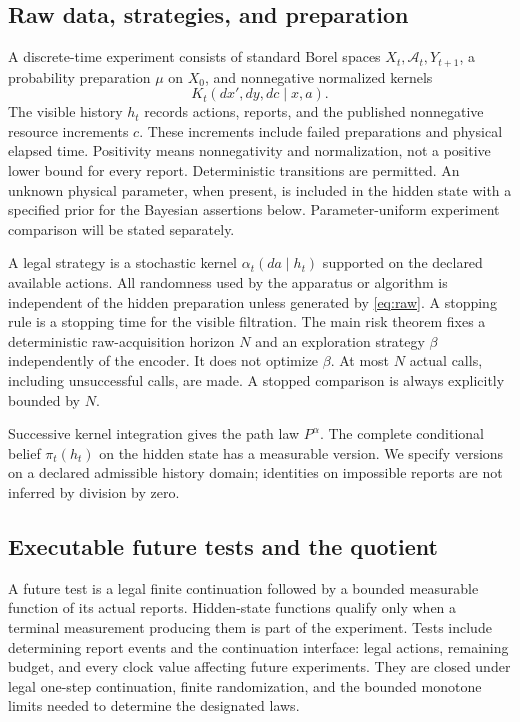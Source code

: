 \subsection{Raw data, strategies, and preparation}
A discrete-time experiment consists of standard Borel spaces $X_t,\mathcal A_t,Y_{t+1}$, a probability preparation $\mu$ on $X_0$, and nonnegative normalized kernels
\begin{equation}\label{eq:raw}
 K_t(dx',dy,dc\mid x,a).
\end{equation}
The visible history $h_t$ records actions, reports, and the published nonnegative resource increments $c$. These increments include failed preparations and physical elapsed time. Positivity means nonnegativity and normalization, not a positive lower bound for every report. Deterministic transitions are permitted. An unknown physical parameter, when present, is included in the hidden state with a specified prior for the Bayesian assertions below. Parameter-uniform experiment comparison will be stated separately.

A legal strategy is a stochastic kernel $\alpha_t(da\mid h_t)$ supported on the declared available actions. All randomness used by the apparatus or algorithm is independent of the hidden preparation unless generated by \eqref{eq:raw}. A stopping rule is a stopping time for the visible filtration. The main risk theorem fixes a deterministic raw-acquisition horizon $N$ and an exploration strategy $\beta$ independently of the encoder. It does not optimize $\beta$. At most $N$ actual calls, including unsuccessful calls, are made. A stopped comparison is always explicitly bounded by $N$.

Successive kernel integration gives the path law $P^\alpha$. The complete conditional belief $\pi_t(h_t)$ on the hidden state has a measurable version. We specify versions on a declared admissible history domain; identities on impossible reports are not inferred by division by zero.

\subsection{Executable future tests and the quotient}
A future test is a legal finite continuation followed by a bounded measurable function of its actual reports. Hidden-state functions qualify only when a terminal measurement producing them is part of the experiment. Tests include determining report events and the continuation interface: legal actions, remaining budget, and every clock value affecting future experiments. They are closed under legal one-step continuation, finite randomization, and the bounded monotone limits needed to determine the designated laws.


